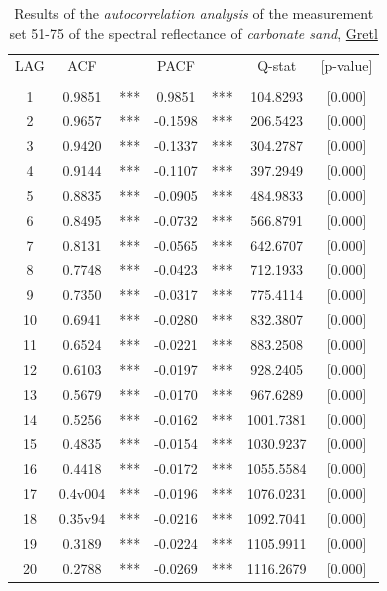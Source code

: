 \documentclass[11pt]{article}
\begin{document}
\begin{appendices}
\begin{table}[htbp]
	\caption{Results of the \textit{autocorrelation analysis} of the measurement set 51-75 of the spectral reflectance of \textit{carbonate sand}, \href{http://gretl.sourceforge.net/}{Gretl}}
	\begin{center}
	\begin{tabular}{|c c c c c c c||}
		\hline\hline
		LAG & ACF & & PACF & & Q-stat & [p-value] \\ \\ \hline\hline
		1  & 0.9851 & ***  & 0.9851& ***   & 104.8293 & [0.000]\\ \hline
		    2  & 0.9657  &***  &-0.1598  &   ***  &  206.5423  &[0.000]\\ \hline
		    3  & 0.9420  &***  &-0.1337  &  ***   &  304.2787  &[0.000]\\ \hline
		    4  & 0.9144  &***  &-0.1107  &  ***   &  397.2949  &[0.000]\\ \hline
		    5  & 0.8835  &***  &-0.0905  &  ***   &  484.9833  &[0.000]\\ \hline
		    6  & 0.8495 & ***  &-0.0732  &  ***   &  566.8791  &[0.000]\\ \hline
		    7  & 0.8131 & ***  &-0.0565  &  ***   &  642.6707  &[0.000]\\ \hline
		    8  & 0.7748 & ***  &-0.0423  &  ***   &  712.1933  &[0.000]\\ \hline
		    9  & 0.7350 & ***  &-0.0317  &  ***   &  775.4114  &[0.000]\\ \hline
		   10 &  0.6941&  *** & -0.0280 &  ***   &   832.3807 & [0.000]\\ \hline
		   11 &  0.6524 & *** & -0.0221 &  ***   &   883.2508 & [0.000]\\ \hline
		   12 &  0.6103 & *** & -0.0197 &  ***   &   928.2405 & [0.000]\\ \hline
		   13 &  0.5679 & *** & -0.0170 &  ***   &   967.6289 & [0.000]\\ \hline
		   14 &  0.5256 & *** & -0.0162 &  ***   &  1001.7381&  [0.000]\\ \hline
		   15 &  0.4835 & *** & -0.0154 &  ***   &  1030.9237 & [0.000]\\ \hline
		   16 & 0.4418 & *** & -0.0172  &  ***  &  1055.5584 & [0.000]\\ \hline
		   17  & 0.4v004 & *** & -0.0196 &***     &  1076.0231 & [0.000]\\ \hline
		   18 & 0.35v94 & *** & -0.0216  & ***   &  1092.7041 & [0.000]\\ \hline
		   19 &  0.3189 & *** & -0.0224   & ***  &  1105.9911 & [0.000]\\ \hline
		   20 &  0.2788 & *** & -0.0269   & ***  &  1116.2679 & [0.000]\\ \hline
	\end{tabular}
	\end{center}
	\label{tab:28}
\end{table}
\pagebreak


\end{appendices}
\end{document}
